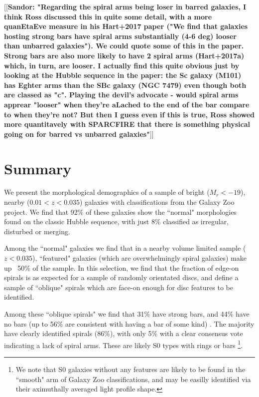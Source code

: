 \documentclass[usenatbib]{mn2e}
\newcommand{\comment}[2][todo]{{\color{#1}[[{\bf #2}]]}}
\begin{document}
\comment{Sandor: "Regarding the spiral arms being loser in barred galaxies, I think Ross discussed this in quite some detail, with a more quanEtaEve measure in his Hart+2017 paper ("We find that galaxies hosting strong bars have spiral arms substantially (4-6 deg) looser than unbarred galaxies"). We could quote some of this in the paper. Strong bars are also more likely to have 2 spiral arms (Hart+2017a) which, in turn, are looser. I actually find this quite obvious just by looking at the Hubble sequence in the paper: the Sc galaxy (M101) has Eghter arms than the SBc galaxy (NGC 7479) even though both are classed as "c". Playing the devil's advocate - would spiral arms apprear "looser" when they're aLached to the end of the bar compare to when they're not? But then I guess even if this is true, Ross showed more quantitavely with SPARCFIRE that there is something physical going on for barred vs unbarred galaxies"}


\section{Summary}

We present the morphological demographics of a sample of bright ($M_r <-19$), nearby ($0.01<z<0.035$) galaxies with classifications from the Galaxy Zoo project. We find that {92\%} of these galaxies show the ``normal" morphologies found on the classic Hubble sequence, with just {8\%} classified as irregular, disturbed or merging. 

Among the ``normal" galaxies we find that in a nearby volume limited sample ($z<0.035$), ``featured" galaxies (which are overwhelmingly spiral galaxies) make up ~50\% of the sample. In this selection, we find that the fraction of edge-on spirals is as expected for a sample of randomly orientated discs, and define a sample of ``oblique" spirals which are face-on enough for disc features to be identified. 

 Among these ``oblique spirals" we find that {31\%} have strong bars, and {44\%} have no bars (up to 56\% are consistent with having a bar of some kind) . The majority have clearly identified spirals ({86\%}), with only {5\%} with a clear consensus vote indicating a lack of spiral arms. These are likely S0 types with rings or bars \footnote{We note that S0 galaxies without any features are likely to be found in the ``smooth" arm of Galaxy Zoo classifications, and may be easilly identified via their aximuthally averaged light profile shape.}. 
 
\end{document}
